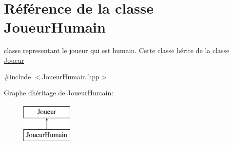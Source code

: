 \hypertarget{class_joueur_humain}{}\section{Référence de la classe Joueur\+Humain}
\label{class_joueur_humain}


classe representant le joueur qui est humain. Cette classe hérite de la classe \hyperlink{class_joueur}{Joueur}  




{\ttfamily \#include $<$Joueur\+Humain.\+hpp$>$}

Graphe d\textquotesingle{}héritage de Joueur\+Humain\+:\begin{figure}[H]
\begin{center}
\leavevmode
\includegraphics[height=2.000000cm]{class_joueur_humain}
\end{center}
\end{figure}
